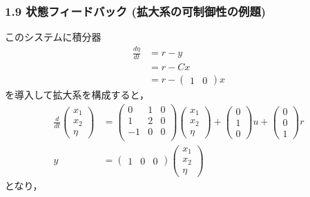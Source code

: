 \begin{frame}[t]
\frametitle{1.9 状態フィードバック (拡大系の可制御性の例題)}
このシステムに積分器
\begin{align}
 \frac{d\eta}{dt} &= r - y \\
 &= r - Cx \\
 &= r - \left(\begin{array}{cc}1 & 0\end{array}\right)x
\end{align}
を導入して拡大系を構成すると，
\begin{align}
 \frac{d}{dt}
 \left(
 \begin{array}{c}
  x_1 \\
  x_2 \\
  \eta
 \end{array}
 \right) &=
 \left(
 \begin{array}{ccc}
  0 & 1 & 0 \\
  1 & 2 & 0 \\
  -1 & 0 & 0 \\
 \end{array}
 \right)
 \left(
 \begin{array}{c}
  x_1 \\
  x_2 \\
  \eta
 \end{array}
 \right) +
 \left(
 \begin{array}{c}
  0 \\
  1 \\
  0
 \end{array}
 \right) u +
 \left(
 \begin{array}{c}
  0 \\
  0 \\
  1
 \end{array}
 \right) r \\
 y &=
 \left(
 \begin{array}{ccc}
  1 & 0 & 0
 \end{array}
 \right)
 \left(
 \begin{array}{c}
  x_1 \\
  x_2 \\
  \eta
 \end{array}
 \right)
\end{align}
となり，
\end{frame}



